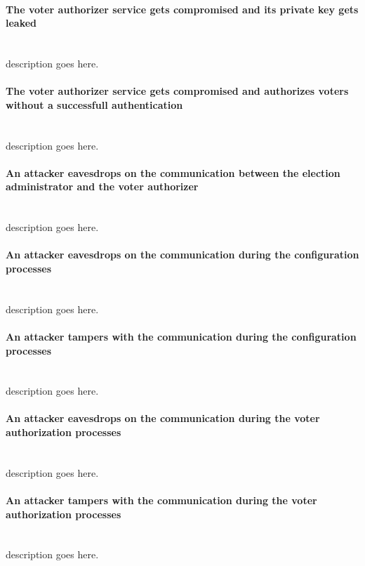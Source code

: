 \paragraph{The voter authorizer service gets compromised and its private key gets leaked} \mbox{} \\
description goes here.


\paragraph{The voter authorizer service gets compromised and authorizes voters without a successfull authentication} \mbox{} \\
description goes here.


\paragraph{An attacker eavesdrops on the communication between the election administrator and the voter authorizer} \mbox{} \\
description goes here.


\paragraph{An attacker eavesdrops on the communication during the configuration processes} \mbox{} \\
description goes here.


\paragraph{An attacker tampers with the communication during the configuration processes} \mbox{} \\
description goes here.


\paragraph{An attacker eavesdrops on the communication during the voter authorization processes} \mbox{} \\
description goes here.


\paragraph{An attacker tampers with the communication during the voter authorization processes} \mbox{} \\
description goes here.


